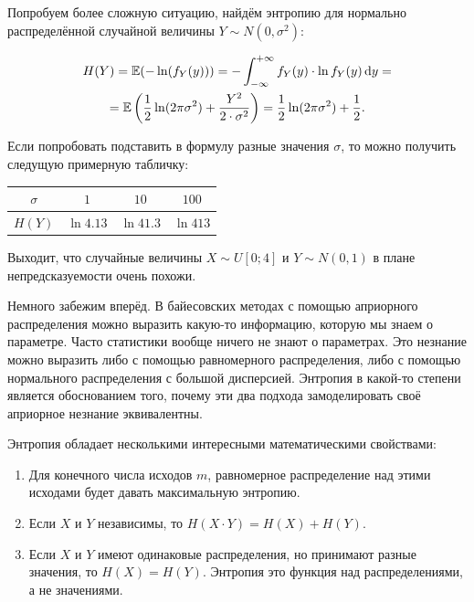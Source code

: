 \documentclass[12pt, a4paper, oneside]{article}
\begin{document}
Попробуем более сложную ситуацию, найдём энтропию для нормально распределённой случайной величины $Y \sim N(0, \sigma^2)$:

\begin{multline*}
H(Y) = \mathbb{E}( - \ln(f_Y(y)))  = - \int_{-\infty}^{+\infty} f_Y(y) \cdot \ln f_Y(y) \,\mathrm{d}y = \\ = \mathbb{E}\left(\frac{1}{2} \ln(2 \pi \sigma^2 ) + \frac{Y^2}{2\cdot \sigma^2}\right) = \frac{1}{2} \ln(2 \pi \sigma^2) + \frac{1}{2}.
\end{multline*} 

Если попробовать подставить в формулу разные значения $\sigma$, то можно получить следущую примерную табличку: 

\begin{center}
	\begin{tabular}{c|c|c|c}
		$\sigma$ & $1$ & $10$  &  $100$  \\ \hline
		$H(Y)$ & $\ln 4.13 $ & $\ln 41.3 $  & $\ln 413 $
	\end{tabular}
\end{center}

Выходит, что случайные величины $X \sim U[0;4]$ и $Y \sim N(0,1)$ в плане непредсказуемости очень похожи.  

Немного забежим вперёд. В байесовских методах с помощью априорного распределения можно выразить какую-то информацию, которую мы знаем о параметре. Часто статистики вообще ничего не знают о параметрах. Это незнание можно выразить либо с помощью равномерного распределения, либо с помощью нормального распределения с большой дисперсией. Энтропия в какой-то степени является обоснованием того, почему эти два подхода замоделировать своё априорное незнание эквивалентны. 

Энтропия обладает несколькими интересными математическими свойствами:

\begin{enumerate}
	\item  Для конечного числа исходов $m$, равномерное распределение над этими исходами будет давать максимальную энтропию. 

	\item Если $X$ и $Y$ независимы, то $H(X \cdot Y) = H(X) + H(Y)$. 
	
	\item Если $X$ и $Y$ имеют одинаковые распределения, но принимают разные значения, то $H(X) = H(Y)$. Энтропия это функция над распределениями, а не значениями. 
\end{enumerate}
\end{document}
